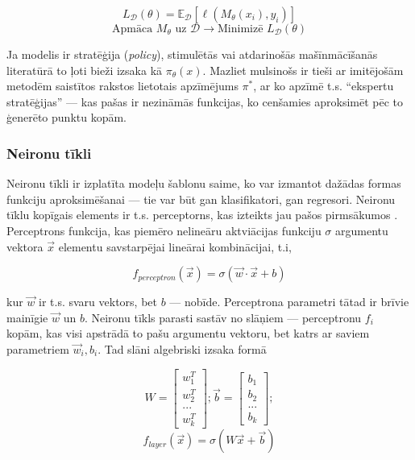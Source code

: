 \documentclass[12pt, a4paper]{article}
\numberwithin{equation}{section} %
\begin{document}
\begin{equation} 
    L_{\mathcal{D}}(\theta) = \mathbb{E}_{\mathcal{D}} [\ell(M_{\theta}(x_i), y_i)]
\end{equation}
\begin{equation} 
    \text{Apmāca } M_{\theta} \text{ uz } \mathcal{D} \rightarrow \text{Minimizē } L_{\mathcal{D}}(\theta)
\end{equation}

Ja modelis ir stratēģija (\textit{policy}), stimulētās vai atdarinošās mašīnmācīšanās literatūrā to ļoti bieži izsaka kā $\pi_{\theta}(x)$. Mazliet mulsinošs ir tieši ar imitējošām metodēm saistītos rakstos lietotais apzīmējums $\pi^*$, ar ko apzīmē t.s. ``ekspertu stratēģijas'' --- kas pašas ir nezināmās funkcijas, ko cenšamies aproksimēt pēc to ģenerēto punktu kopām. 


\subsubsection{Neironu tīkli}

Neironu tīkli ir izplatīta modeļu šablonu saime, ko var izmantot dažādas formas funkciju aproksimēšanai --- tie var būt gan klasifikatori, gan regresori. Neironu tīklu kopīgais elements ir t.s. perceptorns, kas izteikts jau pašos pirmsākumos \cite{mcculloch1943logical}. Perceptrons funkcija, kas piemēro nelineāru aktviācijas funkciju $\sigma$ argumentu vektora $\vec{x}$ elementu savstarpējai lineārai kombinācijai, t.i,


\begin{equation} 
    f_{perceptron}(\vec{x}) = \sigma(\vec{w} \cdot \vec{x}+b)
\end{equation}

kur $\vec{w}$ ir t.s. svaru vektors, bet $b$ ---  nobīde. Perceptrona parametri tātad ir brīvie mainīgie $\vec{w}$ un $b$. Neironu tīkls parasti sastāv no slāņiem --- perceptronu $f_i$ kopām, kas visi apstrādā to pašu argumentu vektoru, bet katrs ar saviem parametriem $\vec{w}_i,b_i$. Tad slāni algebriski izsaka formā

\begin{equation} 
    W = \begin{bmatrix}
        w_1^T \\
        w_2^T \\
        ... \\
        w_k^T
    \end{bmatrix}; 
    \vec{b} =  \begin{bmatrix}
        b_1 \\
        b_2 \\
        ... \\
        b_k
    \end{bmatrix}; 
\end{equation}
\begin{equation} 
    f_{layer}(\vec{x}) = \sigma(W\vec{x}+\vec{b})
\end{equation}
\end{document}

